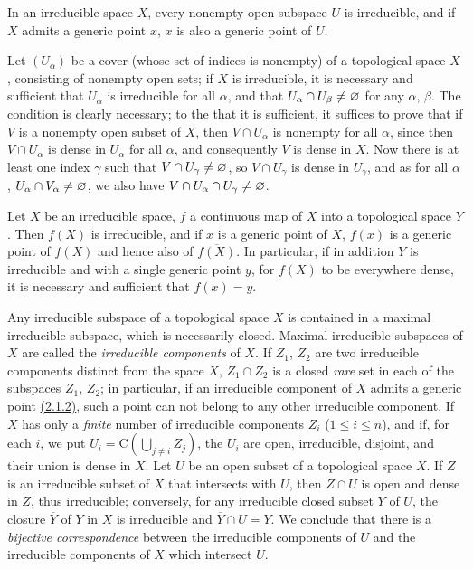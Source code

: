 \begin{env}[2.1.4]
\label{0.2.1.4}
In an irreducible space $X$, every nonempty open subspace $U$ is irreducible,
and if $X$ admits a generic point $x$, $x$ is also a generic point of $U$.

Let $(U_\alpha)$ be a cover (whose set of indices is nonempty) of a topological
space $X$, consisting of nonempty open sets; if $X$ is irreducible, it is
necessary and sufficient that $U_\alpha$ is irreducible for all $\alpha$, and
that $U_\alpha\cap U_\beta\neq\varnothing$ for any $\alpha$, $\beta$. The condition is
clearly necessary; to the that it is sufficient, it suffices to prove that if
$V$ is a nonempty open subset of $X$, then $V\cap U_\alpha$ is nonempty for all
$\alpha$, since then $V\cap U_\alpha$ is dense in $U_\alpha$ for all $\alpha$,
and consequently $V$ is dense in $X$. Now there is at least one index $\gamma$
such that $V\cap U_\gamma\neq\varnothing$, so $V\cap U_\gamma$ is dense in $U_\gamma$,
and as for all $\alpha$, $U_\alpha\cap V_\alpha\neq\varnothing$, we also have
$V\cap U_\alpha\cap U_\gamma\neq\varnothing$.
\end{env}

\begin{env}[2.1.5]
\label{0.2.1.5}
Let $X$ be an irreducible space, $f$ a continuous map of $X$ into a topological
space $Y$. Then $f(X)$ is irreducible, and if $x$ is a generic point of $X$,
$f(x)$ is a generic point of $f(X)$ and hence also of $\overline{f(X)}$. In
particular, if in addition $Y$ is irreducible and with a single generic point
$y$, for $f(X)$ to be everywhere dense, it is necessary and sufficient that
$f(x)=y$.
\end{env}

\begin{env}[2.1.6]
\label{0.2.1.6}
Any irreducible subspace of a topological space $X$ is contained in a maximal
irreducible subspace, which is necessarily closed. Maximal irreducible subspaces
of $X$ are called the {\em irreducible components} of $X$. If $Z_1$, $Z_2$ are
two irreducible components distinct from the space $X$, $Z_1\cap Z_2$ is a
closed {\em rare} set in each of the subspaces $Z_1$, $Z_2$; in particular, if
an irreducible component of $X$ admits a generic point \hyperref[0.2.1.2]{(2.1.2)}, such a
point can not belong to any other irreducible component. If $X$ has only a
{\em finite} number of irreducible components $Z_i$
($1\leqslant i\leqslant n$), and if, for each $i$, we put
$U_i=\mathrm{C}(\bigcup_{j\neq i}Z_j)$, the $U_i$ are open, irreducible,
disjoint, and their union is dense in $X$. Let $U$ be an open subset of a
topological space $X$. If $Z$ is an irreducible subset of $X$ that intersects
with $U$, then $Z\cap U$ is open and dense in $Z$, thus irreducible; conversely,
for any irreducible closed subset $Y$ of $U$, the closure $\overline{Y}$ of $Y$
in $X$ is irreducible and $\overline{Y}\cap U=Y$. We conclude that there is a
{\em bijective correspondence} between the irreducible components of $U$ and
the irreducible components of $X$ which intersect $U$.
\end{env}


